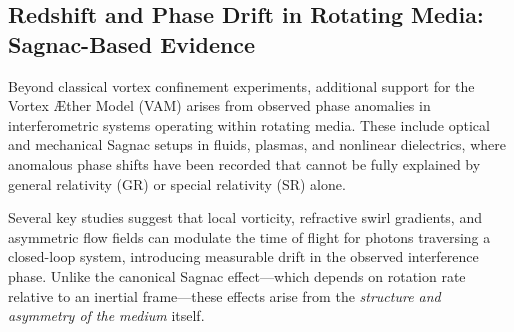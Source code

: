 \subsection{Redshift and Phase Drift in Rotating Media: Sagnac-Based Evidence}

Beyond classical vortex confinement experiments, additional support for the Vortex Æther Model (VAM) arises from observed phase anomalies in interferometric systems operating within rotating media. These include optical and mechanical Sagnac setups in fluids, plasmas, and nonlinear dielectrics, where anomalous phase shifts have been recorded that cannot be fully explained by general relativity (GR) or special relativity (SR) alone.

Several key studies suggest that local vorticity, refractive swirl gradients, and asymmetric flow fields can modulate the time of flight for photons traversing a closed-loop system, introducing measurable drift in the observed interference phase. Unlike the canonical Sagnac effect—which depends on rotation rate relative to an inertial frame—these effects arise from the \emph{structure and asymmetry of the medium} itself.
